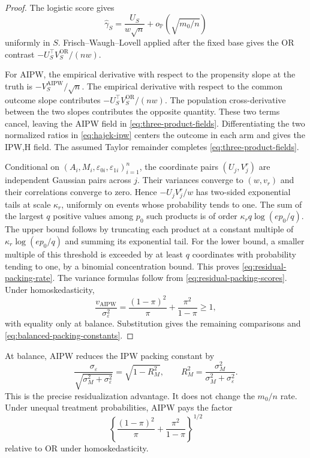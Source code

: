 \documentclass[a4paper,10pt,english]{article}
\newcommand{\Prob}{\mathbb P}
\begin{document}
\begin{proof}
The logistic score gives
\begin{equation*}
 \hat\gamma_S=\frac{U_S}{w\sqrt n}+o_{\Prob}(\sqrt{m_0/n})
\end{equation*}
uniformly in $S$.  Frisch--Waugh--Lovell applied after the fixed base gives
the OR contrast $-U_S^\top V_S^{\mathrm{OR}}/(nw)$.

For AIPW, the empirical derivative with respect to the propensity slope at
the truth is $-V_S^{\mathrm{AIPW}}/\sqrt n$.  The empirical derivative with
respect to the common outcome slope contributes
$-U_S^\top V_S^{\mathrm{OR}}/(nw)$.  The population cross-derivative between
the two slopes contributes the opposite quantity.  These two terms cancel,
leaving the AIPW field in \eqref{eq:three-product-fields}.  Differentiating
the two normalized ratios in \eqref{eq:hajek-ipw} centers the outcome in
each arm and gives the IPW,H field.  The assumed Taylor remainder completes
\eqref{eq:three-product-fields}.

Conditional on $(A_i,M_i,\varepsilon_{0i},\varepsilon_{1i})_{i=1}^n$, the
coordinate pairs $(U_j,V_j^r)$ are independent Gaussian pairs across $j$.
Their variances converge to $(w,v_r)$ and their correlations converge to
zero.  Hence $-U_jV_j^r/w$ has two-sided exponential tails at scale
$\kappa_r$, uniformly on events whose probability tends to one.  The sum of
the largest $q$ positive values among $p_0$ such products is of order
$\kappa_rq\log(ep_0/q)$.  The upper bound follows by
truncating each product at a constant multiple of
$\kappa_r\log(ep_0/q)$ and summing its exponential tail.  For the lower
bound, a smaller multiple of this threshold is exceeded by at least $q$
coordinates with probability tending to one, by a binomial concentration
bound.  This proves \eqref{eq:residual-packing-rate}.  The variance formulas
follow from \eqref{eq:residual-packing-scores}.  Under homoskedasticity,
\begin{equation*}
 \frac{v_{\mathrm{AIPW}}}{\sigma_\varepsilon^2}
 =\frac{(1-\pi)^2}{\pi}+\frac{\pi^2}{1-\pi}\ge1,
\end{equation*}
with equality only at balance.  Substitution gives the remaining
comparisons and \eqref{eq:balanced-packing-constants}.
\end{proof}

At balance, AIPW reduces the IPW packing constant by
\begin{equation*}
 \frac{\sigma_\varepsilon}
 {\sqrt{\sigma_M^2+\sigma_\varepsilon^2}}=\sqrt{1-R_M^2},
 \qquad
 R_M^2=\frac{\sigma_M^2}
 {\sigma_M^2+\sigma_\varepsilon^2}.
\end{equation*}
This is the precise residualization advantage.  It does not change the
$m_0/n$ rate.  Under unequal treatment probabilities, AIPW pays the factor
\begin{equation*}
 \left\{\frac{(1-\pi)^2}{\pi}
 +\frac{\pi^2}{1-\pi}\right\}^{1/2}
\end{equation*}
relative to OR under homoskedasticity.
\end{document}
